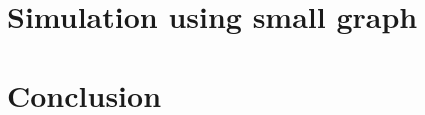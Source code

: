 \documentclass[reqno,10pt]{amsart}
\numberwithin{equation}{section}                %
\begin{document}
\bigskip

\section{Simulation using small graph}
\label{sec:smallgraphs}



\bigskip

\section{Conclusion}
\label{sec:conclusion}



   
\end{document}

